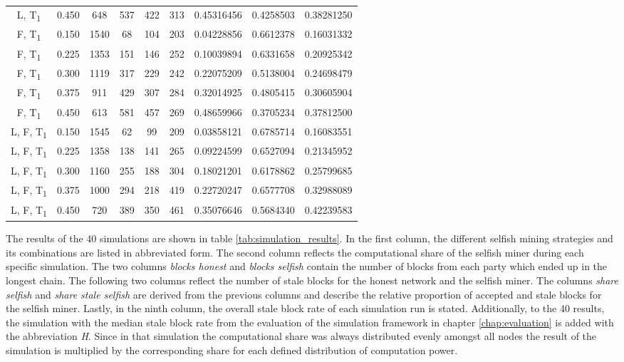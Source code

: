 {\begin{landscape}
\begin{tabular}{ccccccccc}
            L, T\textsubscript{1} & 0.450 & 648 & 537 & 422 & 313 & 0.45316456 & 0.4258503 & 0.38281250 \\
            F, T\textsubscript{1} & 0.150 & 1540 & 68 & 104 & 203 & 0.04228856 & 0.6612378 & 0.16031332 \\
            F, T\textsubscript{1} & 0.225 & 1353 & 151 & 146 & 252 & 0.10039894 & 0.6331658 & 0.20925342 \\
            F, T\textsubscript{1} & 0.300 & 1119 & 317 & 229 & 242 & 0.22075209 & 0.5138004 & 0.24698479 \\
            F, T\textsubscript{1} & 0.375 & 911 & 429 & 307 & 284 & 0.32014925 & 0.4805415 & 0.30605904 \\
            F, T\textsubscript{1} & 0.450 & 613 & 581 & 457 & 269 & 0.48659966 & 0.3705234 & 0.37812500 \\
            L, F, T\textsubscript{1} & 0.150 & 1545 & 62 & 99 & 209 & 0.03858121 & 0.6785714 & 0.16083551 \\
            L, F, T\textsubscript{1} & 0.225 & 1358 & 138 & 141 & 265 & 0.09224599 & 0.6527094 & 0.21345952 \\
            L, F, T\textsubscript{1} & 0.300 & 1160 & 255 & 188 & 304 & 0.18021201 & 0.6178862 & 0.25799685 \\
            L, F, T\textsubscript{1} & 0.375 & 1000 & 294 & 218 & 419 & 0.22720247 & 0.6577708 & 0.32988089 \\
            L, F, T\textsubscript{1} & 0.450 & 720 & 389 & 350 & 461 & 0.35076646 & 0.5684340 & 0.42239583 \\
    		\bottomrule
  		\end{tabular}
  		\label{tab:simulation_results}
	\end{landscape}
}

The results of the 40 simulations are shown in table \ref{tab:simulation_results}.
In the first column, the different selfish mining strategies and its combinations are listed in abbreviated form.
The second column reflects the  computational share of the selfish miner during each specific simulation.
The two columns \textit{blocks honest} and \textit{blocks selfish} contain the number of blocks from each party which ended up in the longest chain.
The following two columns reflect the number of stale blocks for the honest network and the selfish miner.
The columns \textit{share selfish} and \textit{share stale selfish} are derived from the previous columns and describe the relative proportion of accepted and stale blocks for the selfish miner.
Lastly, in the ninth column, the overall stale block rate of each simulation run is stated.
Additionally, to the 40 results, the simulation with the median stale block rate from the evaluation of the simulation framework in chapter \ref{chap:evaluation} is added with the abbreviation \textit{H}.
Since in that simulation the computational share was always distributed evenly amongst all nodes the result of the simulation is multiplied by the corresponding share for each defined distribution of computation power.

